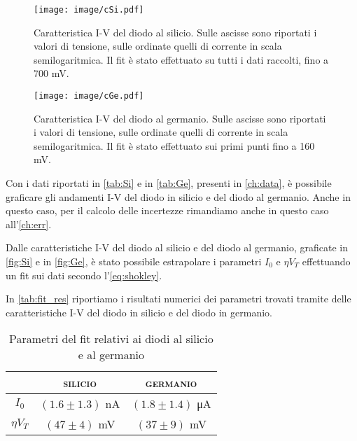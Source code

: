 \begin{figure}[htb!]
    \centering
    \texttt{[image: image/cSi.pdf]}
    \caption{Caratteristica I-V del diodo al silicio. Sulle ascisse sono riportati i valori di tensione, sulle ordinate quelli di corrente in scala semilogaritmica. Il fit è stato effettuato su tutti i dati raccolti, fino a 700 \si{\milli\volt}.}
    \label{fig:Si}
\end{figure}

\begin{figure}[htb!]
    \centering
    \texttt{[image: image/cGe.pdf]}
    \caption{Caratteristica I-V del diodo al germanio.  Sulle ascisse sono riportati i valori di tensione, sulle ordinate quelli di corrente in scala semilogaritmica. Il fit è stato effettuato sui primi punti fino a 160 \si{\milli\volt}.}
    \label{fig:Ge}
\end{figure}
Con i dati riportati in \autoref{tab:Si} e in \autoref{tab:Ge}, presenti in \autoref{ch:data}, è possibile graficare gli andamenti I-V del diodo in silicio e del diodo al germanio. Anche in questo caso, per il calcolo delle incertezze rimandiamo anche in questo caso all’\autoref{ch:err}.

Dalle caratteristiche I-V del diodo al silicio e del diodo al germanio, graficate in \autoref{fig:Si} e in \autoref{fig:Ge}, è stato possibile estrapolare i parametri $I_0$ e  $\eta V_T$ effettuando un fit sui dati secondo l'\autoref{eq:shokley}.

In \autoref{tab:fit_res} riportiamo i risultati numerici dei parametri trovati tramite delle caratteristiche I-V del diodo in silicio e del diodo in germanio.

\begin{table}[htb]
    \centering
    \begin{tabular}{||c||c||c||}
    \hline \hline
      & \textsc{silicio} & \textsc{germanio}\\
    \hline \hline
    $I_0$ & $(1.6 \pm 1.3)$ \si{\nano\ampere} & $(1.8 \pm 1.4)$ \si{\micro\ampere}\\
    $\eta V_T$ & $(47 \pm 4)$ \si{\milli\volt} & $(37 \pm 9)$ \si{\milli\volt} \\
    \hline\hline
    \end{tabular}
    \caption{Parametri del fit relativi ai diodi al silicio e al germanio}
    \label{tab:fit_res}
\end{table}